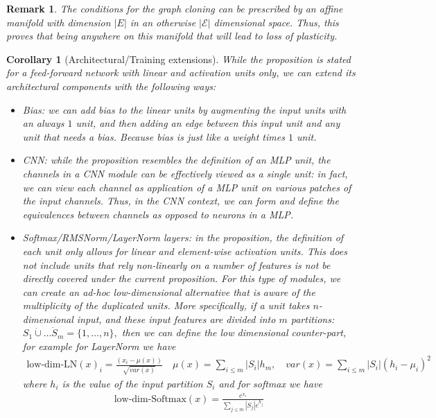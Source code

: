 \documentclass[11pt]{article}
\newtheorem{corollary}{Corollary}[section]
\newtheorem{remark}{Remark}[section]
\begin{document}
\begin{remark}
    The conditions for the graph cloning can be prescribed by an affine manifold with dimension $|E|$ in an otherwise $|\mathcal{E}|$ dimensional space. Thus, this proves that being anywhere on this manifold that will lead to loss of plasticity. 
\end{remark}

\begin{corollary}[Architectural/Training extensions]
    While the proposition is stated for a feed-forward network with linear and activation units only, we can extend its architectural components with the following ways: 
    \begin{itemize}
        \item Bias: we can add bias to the linear units by augmenting the input units with an always $1$ unit, and then adding an edge between this input unit and any unit that needs a bias. Because bias is just like a weight times $1$ unit. 
        \item CNN: while the proposition resembles the definition of an MLP unit, the channels in a CNN module can be effectively viewed as a single unit: in fact, we can view each channel as application of a MLP unit on various patches of the input channels. Thus, in the CNN context, we can form and define the equivalences between channels as opposed to neurons in a MLP. 
        \item Softmax/RMSNorm/LayerNorm layers: in the proposition, the definition of each unit only allows for linear and element-wise activation units. This does not include units that rely non-linearly on a number of features is not be directly covered under the current proposition. For this type of modules, we can create an ad-hoc low-dimensional alternative that is aware of the multiplicity of the duplicated units. More specifically, if a unit takes $n$-dimensional input, and these input features are divided into $m$ partitions: $S_1\dot\cup \dots \dot S_m = \{1,\dots, n\}, $ then we can define the low dimensional counter-part, for example for LayerNorm  we have  
        \begin{align*}
            \text{low-dim-LN}(x)_i = \frac{(x_i-\mu(x))}{\sqrt{var(x)}} \quad 
            \mu(x) = \sum_{i\le m} |S_i| h_m, \quad var(x) =\sum_{i\le m} |S_i| (h_i-\mu_i )^2
        \end{align*}
        where $h_i$ is the value of the input partition $S_i$
        and for softmax we have
        \begin{align*}
            \text{low-dim-Softmax}(x) = \frac{e^{x_i}}{\sum_{j\le m} |S_j| e^{h_j}}

\end{align*}
\end{itemize}
\end{corollary}
\end{document}
